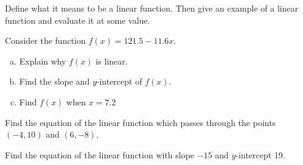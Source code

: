 \documentclass[11pt,letterpaper]{article}
\begin{document}

 Define what it means to be a linear function. Then give an example of a linear function and evaluate it at some value. 



\newpage



 Consider the function $f(x)= 121.5 - 11.6x$. 
	\begin{enumerate}[(a)]
	\item Explain why $f(x)$ is linear.
	\item Find the slope and $y$-intercept of $f(x)$.
	\item Find $f(x)$ when $x= 7.2$
	\end{enumerate}



\newpage



 Find the equation of the linear function which passes through the points $(-4, 10)$ and $(6, -8)$.



\newpage



 Find the equation of the linear function with slope $-15$ and $y$-intercept 19. 
\end{document}
